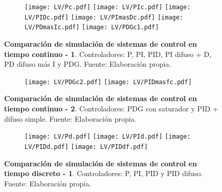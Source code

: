     \begin{figure}[!h]
        \centering
        \begin{subfigure}[t]{0.99\textwidth}
            \centering
            \texttt{[image: LV/Pc.pdf]}
            \texttt{[image: LV/PIc.pdf]}
            \texttt{[image: LV/PIDc.pdf]}
            \texttt{[image: LV/PImasDc.pdf]}
            \texttt{[image: LV/PDmasIc.pdf]}
            \texttt{[image: LV/PDGc1.pdf]}
            \label{fig:simC1}
        \end{subfigure}
        \caption[Comparación de simulación de sistemas de control continuos - 1]{\textbf{Comparación de simulación de sistemas de control en tiempo continuo - 1}. Controladores: P, PI, PID, PI difuso + D, PD difuso más I y PDG. Fuente: Elaboración propia. \label{fig:simC1f}}
    \end{figure}

    \begin{figure}[htb]
        \centering
        \begin{subfigure}[t]{0.99\textwidth}
            \centering
            \texttt{[image: LV/PDGc2.pdf]}
            \texttt{[image: LV/PIDmasfc.pdf]}
            \label{fig:simC2}
        \end{subfigure}
        \caption[Comparación de simulación de sistemas de control continuos - 2]{\textbf{Comparación de simulación de sistemas de control en tiempo continuo - 2}. Controladores: PDG con saturador y PID + difuso simple. Fuente: Elaboración propia. \label{fig:simC2f}}
    \end{figure}

    \begin{figure}[htb]
        \centering
        \begin{subfigure}[t]{0.99\textwidth}
            \centering
            \texttt{[image: LV/Pd.pdf]}
            \texttt{[image: LV/PId.pdf]}
            \texttt{[image: LV/PIDd.pdf]}
            \texttt{[image: LV/PIDdf.pdf]}
            \label{fig:simD1}
        \end{subfigure}
        \caption[Comparación de simulación de sistemas de control discretos - 1]{\textbf{Comparación de simulación de sistemas de control en tiempo discreto - 1}. Controladores: P, PI, PID y PID difuso. Fuente: Elaboración propia. \label{fig:simD1f}}
    \end{figure}

